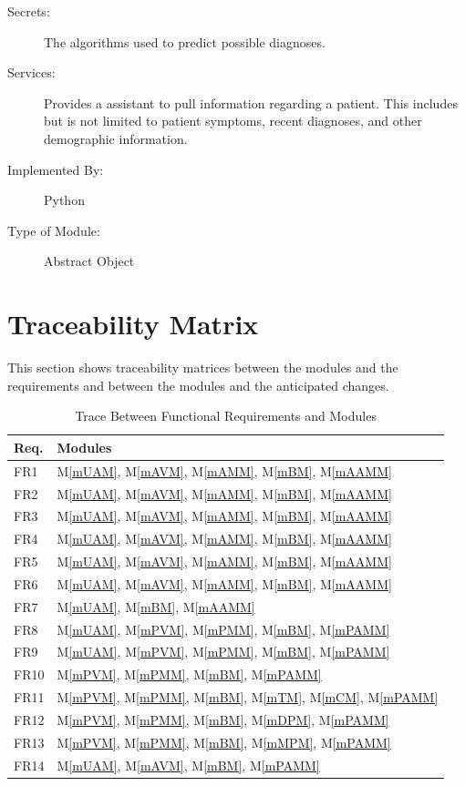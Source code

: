 \documentclass[12pt, titlepage]{article}
\newcommand{\mref}[1]{M\ref{#1}}
\begin{document}
\begin{description}
\item[Secrets:]The algorithms used to predict possible diagnoses.
\item[Services:] Provides a assistant to pull information regarding a patient. This includes but is not limited to patient symptoms, recent diagnoses, and other demographic information.
\item[Implemented By:]Python
\item[Type of Module:]Abstract Object
\end{description}

\section{Traceability Matrix} \label{SecTM}

This section shows traceability matrices between the modules and the requirements and between the modules and the anticipated changes.

\begin{table}[H]
\centering
\begin{tabular}{p{} p{}}
\toprule
\textbf{Req.} & \textbf{Modules}\\
\midrule
FR1 & \mref{mUAM}, \mref{mAVM}, \mref{mAMM}, \mref{mBM}, \mref{mAAMM}\\
FR2 & \mref{mUAM}, \mref{mAVM}, \mref{mAMM}, \mref{mBM}, \mref{mAAMM}\\
FR3 & \mref{mUAM}, \mref{mAVM}, \mref{mAMM}, \mref{mBM}, \mref{mAAMM}\\
FR4 & \mref{mUAM}, \mref{mAVM}, \mref{mAMM}, \mref{mBM}, \mref{mAAMM}\\
FR5 & \mref{mUAM}, \mref{mAVM}, \mref{mAMM}, \mref{mBM}, \mref{mAAMM}\\
FR6 & \mref{mUAM}, \mref{mAVM}, \mref{mAMM}, \mref{mBM}, \mref{mAAMM}\\
FR7 & \mref{mUAM}, \mref{mBM}, \mref{mAAMM}\\
FR8 & \mref{mUAM}, \mref{mPVM}, \mref{mPMM}, \mref{mBM}, \mref{mPAMM}\\
FR9 & \mref{mUAM}, \mref{mPVM}, \mref{mPMM}, \mref{mBM}, \mref{mPAMM}\\
FR10 & \mref{mPVM}, \mref{mPMM}, \mref{mBM}, \mref{mPAMM}\\
FR11 & \mref{mPVM}, \mref{mPMM}, \mref{mBM}, \mref{mTM}, \mref{mCM}, \mref{mPAMM}\\
FR12 & \mref{mPVM}, \mref{mPMM}, \mref{mBM}, \mref{mDPM}, \mref{mPAMM}\\
FR13 & \mref{mPVM}, \mref{mPMM}, \mref{mBM}, \mref{mMPM}, \mref{mPAMM}\\
FR14 & \mref{mUAM}, \mref{mAVM}, \mref{mBM}, \mref{mPAMM}\\
\bottomrule
\end{tabular}
\caption{Trace Between Functional Requirements and Modules}
\label{TblRT}
\end{table}
\end{document}
